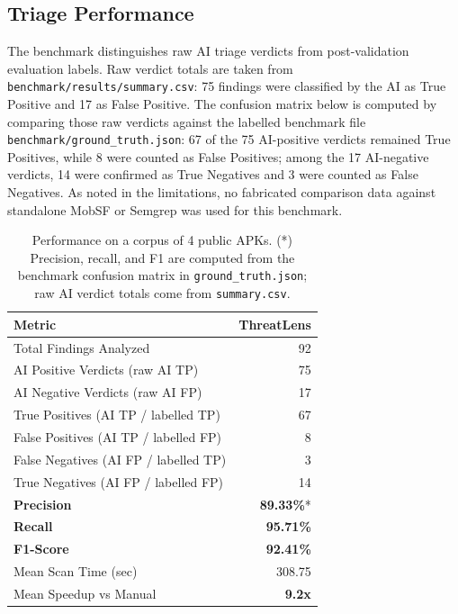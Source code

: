 \documentclass[preprint,12pt,a4paper]{elsarticle}
\begin{document}
\subsection{Triage Performance}

The benchmark distinguishes raw AI triage verdicts from post-validation evaluation labels. Raw verdict totals are taken from \texttt{benchmark/results/summary.csv}: 75 findings were classified by the AI as True Positive and 17 as False Positive. The confusion matrix below is computed by comparing those raw verdicts against the labelled benchmark file \texttt{benchmark/ground\_truth.json}: 67 of the 75 AI-positive verdicts remained True Positives, while 8 were counted as False Positives; among the 17 AI-negative verdicts, 14 were confirmed as True Negatives and 3 were counted as False Negatives. As noted in the limitations, no fabricated comparison data against standalone MobSF or Semgrep was used for this benchmark.

\begin{table}[!h]
\centering
\begin{tabular}{lr}
\toprule
\textbf{Metric} & \textbf{ThreatLens} \\
\midrule
Total Findings Analyzed  & 92 \\
AI Positive Verdicts (raw AI TP) & 75 \\
AI Negative Verdicts (raw AI FP) & 17 \\
True Positives (AI TP / labelled TP) & 67 \\
False Positives (AI TP / labelled FP) & 8 \\
False Negatives (AI FP / labelled TP) & 3 \\
True Negatives (AI FP / labelled FP) & 14 \\
\textbf{Precision}       & \textbf{89.33\%}* \\
\textbf{Recall}          & \textbf{95.71\%} \\
\textbf{F1-Score}        & \textbf{92.41\%} \\
Mean Scan Time (sec)     & 308.75 \\
Mean Speedup vs Manual   & \textbf{9.2x} \\
\bottomrule
\end{tabular}
\caption{Performance on a corpus of 4 public APKs. (*) Precision, recall, and F1 are computed from the benchmark confusion matrix in \texttt{ground\_truth.json}; raw AI verdict totals come from \texttt{summary.csv}.}
\label{tab:evaluation}
\end{table}
\end{document}
